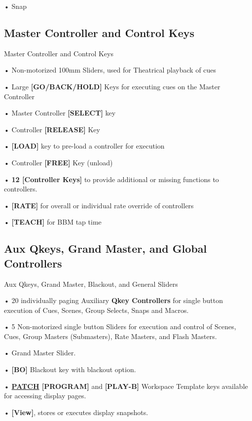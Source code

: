 \documentclass[
]{article}
\begin{document}
• {Snap}

\hypertarget{master-controller-and-control-keys}{%
\subsection{Master Controller and Control Keys}\label{master-controller-and-control-keys}}

Master Controller and Control Keys

• Non-motorized 100mm Sliders, used for Theatrical playback of cues

• Large \textbf{{[}GO/BACK/HOLD{]}} Keys for executing cues on the Master Controller

• Master Controller \textbf{{[}SELECT{]}} key

• Controller \textbf{{[}RELEASE{]}} Key

• \textbf{{[}LOAD{]}} key to pre-load a controller for execution

• Controller \textbf{{[}FREE{]}} Key (unload)

• \textbf{12 {[}Controller Keys{]}} to provide additional or missing functions to controllers.

• \textbf{{[}RATE{]}} for overall or individual rate override of controllers

• \textbf{{[}TEACH{]}} for BBM tap time

\hypertarget{aux-qkeys-grand-master-and-global-controllers}{%
\subsection{Aux Qkeys, Grand Master, and Global Controllers}\label{aux-qkeys-grand-master-and-global-controllers}}

Aux Qkeys, Grand Master, Blackout, and General Sliders

• 20 individually paging Auxiliary \textbf{Qkey Controllers} for single button execution of Cues, Scenes, Group Selects, {Snaps and Macros}.

• 5 Non-motorized single button Sliders for execution and control of Scenes, Cues, Group Masters (Submasters), {Rate Masters, and Flash Masters}.

• Grand Master Slider.

• \textbf{{[}BO{]}} Blackout key with blackout option.

• \textbf{\protect\hyperlink{patch}{PATCH} {[}PROGRAM{]}} and \textbf{{[}PLAY-B{]}} Workspace Template keys available for accessing display pages.

• {\textbf{{[}View{]}}, stores or executes display snapshots.}
\end{document}
